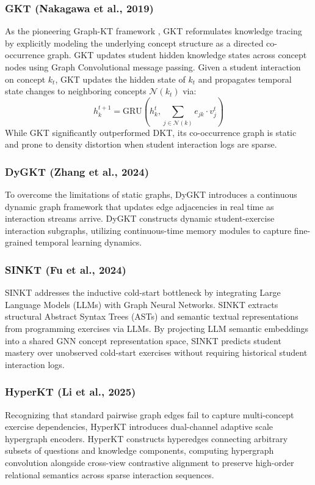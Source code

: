 \documentclass[10pt,journal,compsoc]{IEEEtran}
\begin{document}
\subsubsection{GKT (Nakagawa et al., 2019)}
As the pioneering Graph-KT framework \cite{KT004_GKT_2019}, GKT reformulates knowledge tracing by explicitly modeling the underlying concept structure as a directed co-occurrence graph. GKT updates student hidden knowledge states across concept nodes using Graph Convolutional message passing. Given a student interaction on concept $k_t$, GKT updates the hidden state of $k_t$ and propagates temporal state changes to neighboring concepts $\mathcal{N}(k_t)$ via:
\begin{equation}
h_{k}^{t+1} = \text{GRU}\left( h_{k}^{t}, \sum_{j \in \mathcal{N}(k)} e_{jk} \cdot v_{j}^t \right)
\end{equation}
While GKT significantly outperformed DKT, its co-occurrence graph is static and prone to density distortion when student interaction logs are sparse.

\subsubsection{DyGKT (Zhang et al., 2024)}
To overcome the limitations of static graphs, DyGKT \cite{KT038_DyGKT_2024} introduces a continuous dynamic graph framework that updates edge adjacencies in real time as interaction streams arrive. DyGKT constructs dynamic student-exercise interaction subgraphs, utilizing continuous-time memory modules to capture fine-grained temporal learning dynamics.

\subsubsection{SINKT (Fu et al., 2024)}
SINKT \cite{KT044_SINKT_2024} addresses the inductive cold-start bottleneck by integrating Large Language Models (LLMs) with Graph Neural Networks. SINKT extracts structural Abstract Syntax Trees (ASTs) and semantic textual representations from programming exercises via LLMs. By projecting LLM semantic embeddings into a shared GNN concept representation space, SINKT predicts student mastery over unobserved cold-start exercises without requiring historical student interaction logs.

\subsubsection{HyperKT (Li et al., 2025)}
Recognizing that standard pairwise graph edges fail to capture multi-concept exercise dependencies, HyperKT \cite{KT066_HyperKT_2025} introduces dual-channel adaptive scale hypergraph encoders. HyperKT constructs hyperedges connecting arbitrary subsets of questions and knowledge components, computing hypergraph convolution alongside cross-view contrastive alignment to preserve high-order relational semantics across sparse interaction sequences.
\end{document}
